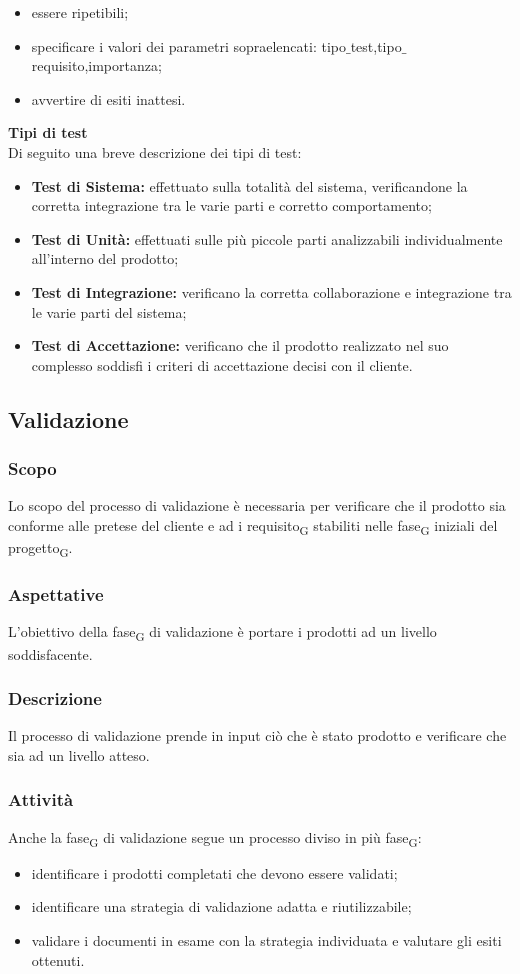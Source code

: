     \begin{itemize}
    	\item essere ripetibili;
    	\item specificare i valori dei parametri sopraelencati: tipo$\_$test,tipo$\_$requisito,importanza;
    	\item avvertire di esiti inattesi.
    \end{itemize}
	\textbf{Tipi di test}\\
	Di seguito una breve descrizione dei tipi di test:
	\begin{itemize}
		\item \textbf{Test di Sistema:} effettuato sulla totalità del sistema, verificandone la corretta integrazione tra le varie parti e corretto comportamento;
		\item \textbf{Test di Unità:} effettuati sulle più piccole parti analizzabili individualmente all'interno del prodotto;
		\item \textbf{Test di Integrazione:} verificano la corretta collaborazione e integrazione tra le varie parti del sistema;
		\item \textbf{Test di Accettazione:} verificano che il prodotto realizzato nel suo complesso soddisfi i criteri di accettazione decisi con il cliente.
	\end{itemize}
\subsection{Validazione}
    \subsubsection{Scopo}
    Lo scopo del processo di validazione è necessaria per verificare che il prodotto sia conforme alle pretese del cliente e ad i requisito\textsubscript{G} stabiliti nelle fase\textsubscript{G} iniziali del progetto\textsubscript{G}.
    \subsubsection{Aspettative}
    L'obiettivo della fase\textsubscript{G} di validazione è portare i prodotti ad un livello soddisfacente.
    \subsubsection{Descrizione}
    Il processo di validazione prende in input ciò che è stato prodotto e verificare che sia ad un livello atteso.
    \subsubsection{Attività}
    Anche la fase\textsubscript{G} di validazione segue un processo diviso in più fase\textsubscript{G}:
    \begin{itemize}
    	\item identificare i prodotti completati che devono essere validati;
    	\item identificare una strategia di validazione adatta e riutilizzabile;
    	\item validare i documenti in esame con la strategia individuata e valutare gli esiti ottenuti.
    \end{itemize}


